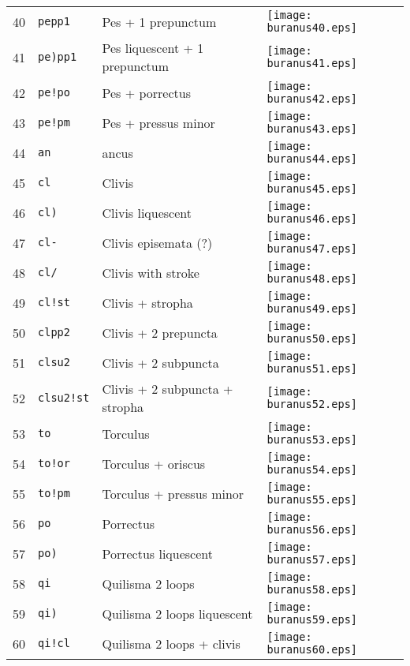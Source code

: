 \documentclass{scrarticle}
\begin{document}
\begin{longtable}{l|l|l|l}
40 & \texttt{pepp1} & Pes + 1 prepunctum & \texttt{[image: buranus40.eps]} \\
41 & \texttt{pe)pp1} & Pes liquescent + 1 prepunctum & \texttt{[image: buranus41.eps]} \\
42 & \texttt{pe!po} & Pes + porrectus & \texttt{[image: buranus42.eps]} \\
43 & \texttt{pe!pm} & Pes + pressus minor & \texttt{[image: buranus43.eps]} \\
44 & \texttt{an} & ancus & \texttt{[image: buranus44.eps]} \\
45 & \texttt{cl} & Clivis & \texttt{[image: buranus45.eps]} \\
46 & \texttt{cl)} & Clivis liquescent & \texttt{[image: buranus46.eps]} \\
47 & \texttt{cl-} & Clivis episemata (?) & \texttt{[image: buranus47.eps]} \\
48 & \texttt{cl/} & Clivis with stroke & \texttt{[image: buranus48.eps]} \\
49 & \texttt{cl!st} & Clivis + stropha & \texttt{[image: buranus49.eps]} \\
50 & \texttt{clpp2} & Clivis + 2 prepuncta & \texttt{[image: buranus50.eps]} \\
51 & \texttt{clsu2} & Clivis + 2 subpuncta & \texttt{[image: buranus51.eps]} \\
52 & \texttt{clsu2!st} & Clivis + 2 subpuncta + stropha & \texttt{[image: buranus52.eps]} \\
53 & \texttt{to} & Torculus & \texttt{[image: buranus53.eps]} \\
54 & \texttt{to!or} & Torculus + oriscus & \texttt{[image: buranus54.eps]} \\
55 & \texttt{to!pm} & Torculus + pressus minor & \texttt{[image: buranus55.eps]} \\
56 & \texttt{po} & Porrectus & \texttt{[image: buranus56.eps]} \\
57 & \texttt{po)} & Porrectus liquescent & \texttt{[image: buranus57.eps]} \\
58 & \texttt{qi} & Quilisma 2 loops & \texttt{[image: buranus58.eps]} \\
59 & \texttt{qi)} & Quilisma 2 loops liquescent & \texttt{[image: buranus59.eps]} \\
60 & \texttt{qi!cl} & Quilisma 2 loops + clivis & \texttt{[image: buranus60.eps]} \\

\end{longtable}
\end{document}
